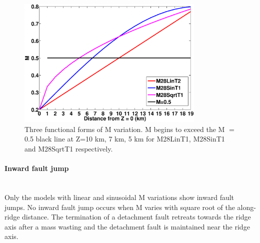 \begin{figure}[h]
  \centering
    \includegraphics[width=0.8\textwidth]{./Figures/fig_Results_3_3_M_variation.eps}
  \caption{Three functional forms of M variation. M begins to exceed the M $=$ 0.5 black line at Z=10 km, 7 km, 5 km for M28LinT1, M28SinT1 and M28SqrtT1 respectively.}
 \label{fig_Results3_1}
\end{figure}   

\paragraph{Inward fault jump}\label{para_InwardFaultJump}
~\\
Only the models with linear and sinusoidal M variations show inward fault jumps. No inward fault jump occurs when M varies with square root of the along-ridge distance. The termination of a detachment fault retreats towards the ridge axis after a mass wasting and the detachment fault is maintained near the ridge axis.

